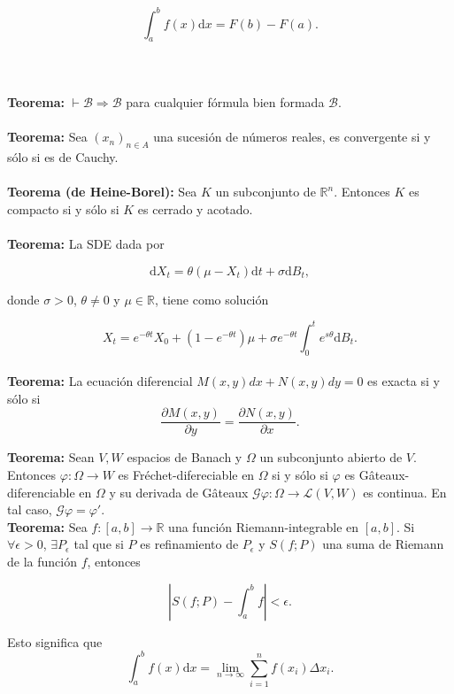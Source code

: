 \documentclass[a4paper,11pt, twocolumn]{article}
\newcommand{\1}{\mathbbm{1}}
\begin{document}
\[\int_a^bf(x)\mathrm{d}x = F(b)-F(a).\] \\\\\\

\textbf{Teorema:} $\vdash \mathcal B\Rightarrow\mathcal B$ para cualquier fórmula bien formada $\mathcal B$.\\\\

\textbf{Teorema:} Sea $(x_n)_{n \in A}$ una sucesión de números reales, es convergente si y sólo si es de Cauchy.\\\\
 
\textbf{Teorema (de Heine-Borel):} Sea $K$ un subconjunto de $\mathbb R^n$. Entonces $K$ es compacto si y sólo si $K$ es cerrado y acotado.\\\\

\textbf{Teorema:} La SDE dada por

\[\mathrm{d}X_t = \theta (\mu-X_t)\mathrm{d}t +\sigma\mathrm{d}B_t,\]

donde $\sigma>0$, $\theta\neq 0$ y $\mu\in\mathbb{R}$, tiene como solución 

\[X_t = e^{-\theta t}X_0 + \left(1-e^{-\theta t}\right)\mu + \sigma e^{-\theta t}\int_0^te^{s\theta}\mathrm{d}B_t.\]\\

\textbf{Teorema:} La ecuación diferencial $M(x,y)dx+N(x,y)dy = 0$ es exacta si y sólo si 
\[\frac{\partial M(x,y)}{\partial y}=\frac{\partial N(x,y)}{\partial x}.\] 

\textbf{Teorema:} Sean $V,W$ espacios de Banach y $\Omega$ un subconjunto abierto de $V$. Entonces $\varphi : \Omega \to W$ es Fréchet-difereciable en $\Omega$ si y sólo si $\varphi$ es Gâteaux-diferenciable en $\Omega$ y su derivada de Gâteaux $\mathcal{G}\varphi:\Omega\to\mathcal{L}(V,W)$ es continua. En tal caso, $\mathcal{G}\varphi = \varphi'$.\\

\textbf{Teorema:} Sea $f:[a,b]\rightarrow\mathbb{R}$ una función Riemann-integrable en $[a,b]$. Si $\forall \epsilon>0$, $\exists P_\epsilon$ tal que si $P$ es refinamiento de $P_\epsilon$ y $S(f;P)$ una suma de Riemann de la función $f$, entonces

$$\left|S(f;P)-\int_a^b f \right|<\epsilon.$$

Esto significa que
$$\int_a^b f(x)\mathrm{d}x = \lim_{n\rightarrow\infty}\sum_{i=1}^n f(x_i)\Delta x_i.$$ 
\end{document}
